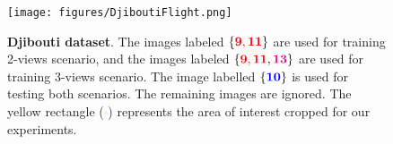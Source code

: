 \documentclass{isprs} %
\begin{document}



\begin{figure}[t!]
	\begin{center}
				\centering
				\texttt{[image: figures/DjiboutiFlight.png]}
		\caption{\textbf{Djibouti dataset}. The images labeled $\{{\textcolor{red}{\textbf{9}, \textbf{11}}}\}$ are used for training 2-views scenario, and the images labeled $\{{\textcolor{red}{\textbf{9}, \textbf{11}}}, \textcolor{magenta}{\textbf{13}}\}$ are used for training 3-views scenario. The image labelled $\{\textcolor{blue}{\textbf{10}}\}$ is used for testing both scenarios. The remaining images are ignored. The yellow rectangle (\textcolor{yellow}{\textbf{$\square$}}) represents the area of interest cropped for our experiments.}\label{DjiboutiFlight}
	\end{center}
\end{figure}
\end{document}
